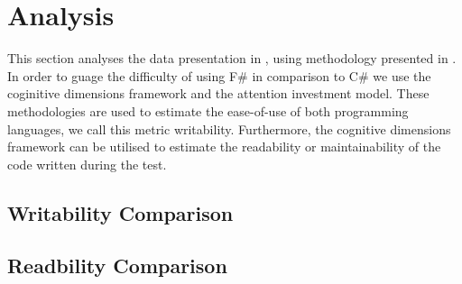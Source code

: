 \section{Analysis}
This section analyses the data presentation in , using methodology presented in . In order to guage the difficulty of using F\# in comparison to C\# we use the coginitive dimensions framework and the attention investment model. These methodologies are used to estimate the ease-of-use of both programming languages, we call this metric writability. Furthermore, the cognitive dimensions framework can be utilised to estimate the readability or maintainability of the code written during the test.

\subsection{Writability Comparison}

\subsection{Readbility Comparison}